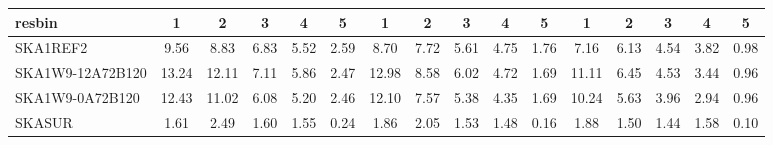 \begin{table}[!htp]
{{\begin{tabular}{|lccccc||ccccc||ccccc|}
 resbin  &1 & 2 & 3 & 4 & 5 & 1 & 2 & 3 & 4 & 5 & 1 & 2 & 3 & 4 & 5 \tabularnewline \hline
SKA1REF2 & 9.56 \cellcolor{blue!46.71} & 8.83 \cellcolor{red!45.68} & 6.83 \cellcolor{green!57.87} & 5.52 \cellcolor{orange!56.69} & 2.59 \cellcolor{purple!60.00} & 8.70 \cellcolor{blue!43.83} & 7.72 \cellcolor{red!54.47} & 5.61 \cellcolor{green!56.16} & 4.75 \cellcolor{orange!60.00} & 1.76 \cellcolor{purple!60.00} & 7.16 \cellcolor{blue!42.03} & 6.13 \cellcolor{red!57.28} & 4.54 \cellcolor{green!60.00} & 3.82 \cellcolor{orange!60.00} & 0.98 \cellcolor{purple!60.00}\\ \hline 
SKA1W9-12A72B120 & 13.24 \cellcolor{blue!60.00} & 12.11 \cellcolor{red!60.00} & 7.11 \cellcolor{green!60.00} & 5.86 \cellcolor{orange!60.00} & 2.47 \cellcolor{purple!57.86} & 12.98 \cellcolor{blue!60.00} & 8.58 \cellcolor{red!60.00} & 6.02 \cellcolor{green!60.00} & 4.72 \cellcolor{orange!59.61} & 1.69 \cellcolor{purple!58.16} & 11.11 \cellcolor{blue!60.00} & 6.45 \cellcolor{red!60.00} & 4.53 \cellcolor{green!59.86} & 3.44 \cellcolor{orange!52.88} & 0.96 \cellcolor{purple!59.05}\\ \hline 
SKA1W9-0A72B120 & 12.43 \cellcolor{blue!57.07} & 11.02 \cellcolor{red!55.24} & 6.08 \cellcolor{green!52.15} & 5.20 \cellcolor{orange!53.57} & 2.46 \cellcolor{purple!57.68} & 12.10 \cellcolor{blue!56.68} & 7.57 \cellcolor{red!53.50} & 5.38 \cellcolor{green!54.01} & 4.35 \cellcolor{orange!54.86} & 1.69 \cellcolor{purple!58.16} & 10.24 \cellcolor{blue!56.04} & 5.63 \cellcolor{red!53.04} & 3.96 \cellcolor{green!52.14} & 2.94 \cellcolor{orange!43.50} & 0.96 \cellcolor{purple!59.05}\\ \hline 
SKASUR & 1.61 \cellcolor{blue!18.00} & 2.49 \cellcolor{red!18.00} & 1.60 \cellcolor{green!18.00} & 1.55 \cellcolor{orange!18.00} & 0.24 \cellcolor{purple!18.00} & 1.86 \cellcolor{blue!18.00} & 2.05 \cellcolor{red!18.00} & 1.53 \cellcolor{green!18.00} & 1.48 \cellcolor{orange!18.00} & 0.16 \cellcolor{purple!18.00} & 1.88 \cellcolor{blue!18.00} & 1.50 \cellcolor{red!18.00} & 1.44 \cellcolor{green!18.00} & 1.58 \cellcolor{orange!18.00} & 0.10 \cellcolor{purple!18.00}\tabularnewline \hline 
\end{tabular}}\hfil 
{}}
\end{table}

